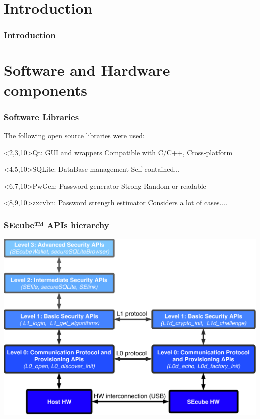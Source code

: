 \documentclass[14pt,usenames,dvipsnames]{beamer}
\begin{document}
\section{Introduction}



\begin{frame}
\frametitle{Introduction}


\end{frame}



\section{Software and Hardware components}

\begin{frame}
\frametitle{Software Libraries}

The following open source libraries were used:

\begin{block}<2,3,10>{Qt: GUI and wrappers}
 {Compatible with C/C++, Cross-platform}
\end{block}

\begin{block}<4,5,10>{SQLite: DataBase management}
 {Self-contained...}
\end{block}

\begin{block}<6,7,10>{PwGen: Password generator}
 {Strong Random or readable}
\end{block}

\begin{block}<8,9,10>{zxcvbn: Password strength estimator}
 {Considers a lot of cases....}
\end{block}
\end{frame}

\begin{frame}
\frametitle{SEcube™ APIs hierarchy}
\begin{center}
\includegraphics[width=\textwidth,height=0.85\textheight,keepaspectratio]{levels}
\end{center}
\end{frame}
\end{document}
